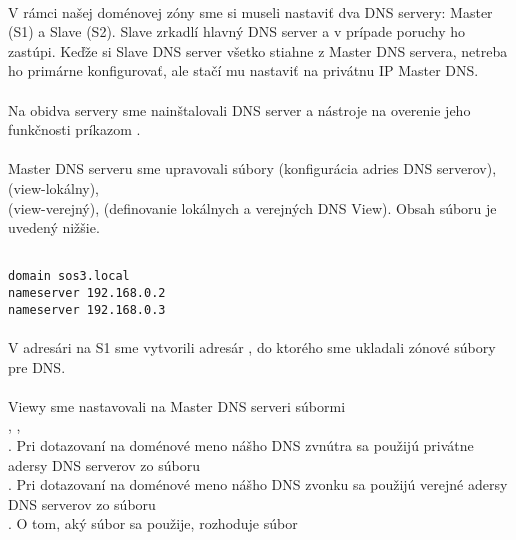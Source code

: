 \paragraph{}
V rámci našej doménovej zóny  sme si museli nastaviť dva DNS servery: Master (S1) a Slave (S2). Slave zrkadlí hlavný DNS server a v prípade poruchy ho zastúpi. Keďže si Slave DNS server všetko stiahne z Master DNS servera, netreba ho primárne konfigurovať, ale stačí mu  nastaviť  na privátnu IP Master DNS.
\paragraph{}
Na obidva servery sme nainštalovali DNS server a nástroje na overenie jeho funkčnosti príkazom .
\paragraph{}
Master DNS serveru sme upravovali súbory  (konfigurácia adries DNS serverov),  (view-lokálny),\\  (view-verejný),  (definovanie lokálnych a verejných DNS View). Obsah súboru  je uvedený nižšie.

\noindent
{\selectfont

\begin{small}

\begin{verbatim}

domain sos3.local
nameserver 192.168.0.2
nameserver 192.168.0.3

\end{verbatim}

\end{small}

}

\paragraph{}
V adresári  na S1 sme vytvorili adresár , do ktorého sme ukladali zónové súbory pre DNS.
\paragraph{}
Viewy sme nastavovali na Master  DNS serveri súbormi\\ , ,\\ . Pri dotazovaní na doménové meno nášho DNS zvnútra sa použijú privátne adersy DNS serverov zo súboru\\ . Pri dotazovaní na doménové meno nášho DNS zvonku sa použijú verejné adersy DNS serverov zo súboru\\ . O tom, aký súbor sa použije, rozhoduje súbor 
